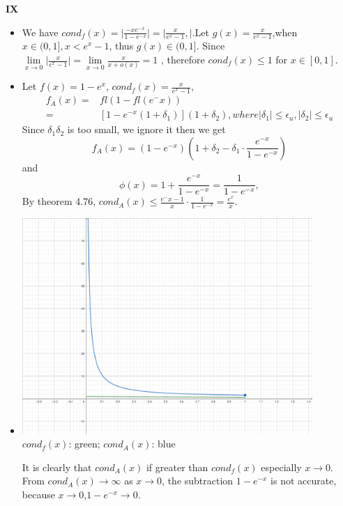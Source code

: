 \documentclass{article}
\begin{document}
\textbf{IX}
\begin{itemize}
    \item We have $cond_f(x) = \lvert \frac{-xe^{-x}}{1-e^{-x}} \rvert = \lvert \frac{x}{e^x-1}, \rvert$.Let $g(x) = \frac{x}{e^x-1}$,when $x \in (0,1], x < e^x -1$, thus $g(x)\in (0,1]$.
    Since $\lim\limits_{x \to 0}\lvert \frac{x}{e^x-1} \rvert =\lim\limits_{x \to 0}\frac{x}{x+o(x)}=1$ , therefore $cond_f(x) \leq 1$ for $x \in [0,1]$.
    \item Let $f(x) = 1-e^x$, $cond_f(x) = \frac{x}{e^x -1}$,
        \begin{align*}
            f_A(x) =& fl(1-fl(e^-x)) \\
            =& [1-e^{-x}(1+\delta_1)](1+\delta_2),where |\delta_1|\leq \epsilon_u,|\delta_2|\leq \epsilon_u            
        \end{align*}
        Since $\delta_1\delta_2$ is too small, we ignore it then we get
        \begin{equation*}
            f_A(x) = (1-e^{-x})(1 + \delta_2 - \delta_1 \cdot \frac{e^{-x}}{1-e^{-x}})
        \end{equation*}and
        \begin{equation*}
            \phi(x) = 1 + \frac{e^{-x}}{1-e^{-x}} = \frac{1}{1-e^{-x}},
        \end{equation*}
        By theorem 4.76, $cond_A(x) \leq \frac{e^-{x}-1}{x} \cdot \frac{1}{1-e^{-x}} = \frac{e^x}{x}$.
        \item 
            \begin{center}
		  \includegraphics[width=11cm]{picture1.png}	
		  $cond_f(x)$: green; $cond_A(x)$: blue
	      \end{center}
        It is clearly that $cond_A(x)$ if greater than $cond_f(x)$ especially $x \rightarrow 0$. From $cond_A(x) \rightarrow \infty$ as $x\rightarrow 0$, the subtraction $1-e^{-x}$ is not accurate, because $x\rightarrow 0$,$1-e^{-x} \rightarrow 0$.
\end{itemize}
\end{document}
